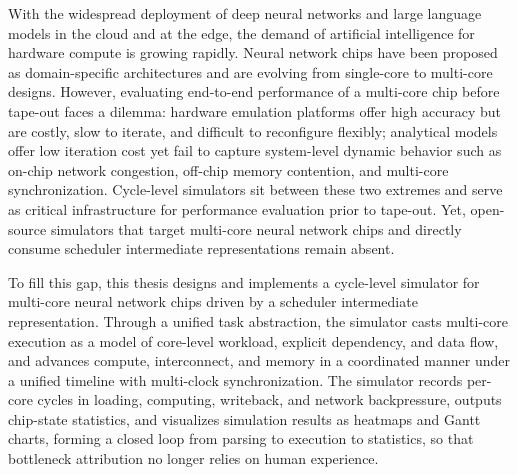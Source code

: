 \begin{englishabstract}

With the widespread deployment of deep neural networks and large language models in the cloud and at the edge, the demand of artificial intelligence for hardware compute is growing rapidly. Neural network chips have been proposed as domain-specific architectures and are evolving from single-core to multi-core designs. However, evaluating end-to-end performance of a multi-core chip before tape-out faces a dilemma: hardware emulation platforms offer high accuracy but are costly, slow to iterate, and difficult to reconfigure flexibly; analytical models offer low iteration cost yet fail to capture system-level dynamic behavior such as on-chip network congestion, off-chip memory contention, and multi-core synchronization. Cycle-level simulators sit between these two extremes and serve as critical infrastructure for performance evaluation prior to tape-out. Yet, open-source simulators that target multi-core neural network chips and directly consume scheduler intermediate representations remain absent.\newline

To fill this gap, this thesis designs and implements a cycle-level simulator for multi-core neural network chips driven by a scheduler intermediate representation. Through a unified task abstraction, the simulator casts multi-core execution as a model of core-level workload, explicit dependency, and data flow, and advances compute, interconnect, and memory in a coordinated manner under a unified timeline with multi-clock synchronization. The simulator records per-core cycles in loading, computing, writeback, and network backpressure, outputs chip-state statistics, and visualizes simulation results as heatmaps and Gantt charts, forming a closed loop from parsing to execution to statistics, so that bottleneck attribution no longer relies on human experience.\newline


\end{englishabstract}
